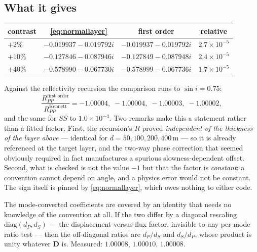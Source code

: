 \documentclass[11pt,a4paper]{article}
\begin{document}
\subsection{What it gives}

\begin{center}
\begin{tabular}{lccc}
\toprule
contrast & \eqref{eq:normallayer} & first order & relative\\
\midrule
$+2\%$  & $-0.019937-0.019792i$ & $-0.019937-0.019792i$ & $2.7\times10^{-5}$\\
$+10\%$ & $-0.127846-0.087946i$ & $-0.127849-0.087948i$ & $2.4\times10^{-5}$\\
$+40\%$ & $-0.578990-0.067730i$ & $-0.578999-0.067736i$ & $1.7\times10^{-5}$\\
\bottomrule
\end{tabular}
\end{center}

Against the reflectivity recursion the comparison runs to $\sin i = 0.75$:
\begin{equation}\label{eq:kenratio}
  \frac{R^{\text{first order}}_{PP}}{R^{\text{Kennett}}_{PP}}
  = -1.00004,\; -1.00004,\; -1.00003,\; -1.00002,
\end{equation}
and the same for $SS$ to $1.0\times10^{-4}$.  Two remarks make this a statement
rather than a fitted factor.  First, the recursion's $R$ proved
\emph{independent of the thickness of the layer above} --- identical for
$d = 50, 100, 200, 400$\,m --- so it is already referenced at the target layer,
and the two-way phase correction that seemed obviously required in fact
manufactures a spurious slowness-dependent offset.  Second, what is checked is
not the value $-1$ but that the factor is \emph{constant}: a convention cannot
depend on angle, and a physics error would not be constant.  The sign itself is
pinned by \eqref{eq:normallayer}, which owes nothing to either code.

The mode-converted coefficients are covered by an identity that needs no
knowledge of the convention at all.  If the two differ by a diagonal rescaling
$\mathrm{diag}(d_P, d_S)$ --- the displacement-versus-flux factor, invisible to
any per-mode ratio test --- then the off-diagonal ratios are $d_P/d_S$ and
$d_S/d_P$, whose product is unity whatever $\mathbf{D}$ is.  Measured:
$1.00008$, $1.00010$, $1.00008$.
\end{document}
